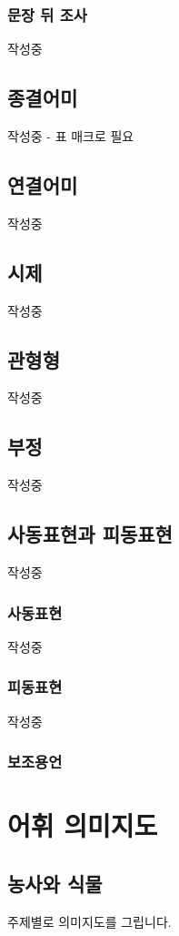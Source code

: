\documentclass{snu-fl-questionnaire}
\begin{document}
\subsection{문장 뒤 조사}
작성중

\section{종결어미}
작성중 - 표 매크로 필요

\section{연결어미}
작성중

\section{시제}
작성중

\section{관형형}
작성중

\section{부정}
작성중

\section{사동표현과 피동표현}
작성중

\subsection{사동표현}
작성중

\subsection{피동표현}
작성중

\subsection{보조용언}

\chapter{어휘 의미지도}
\section{농사와 식물}
주제별로 의미지도를 그립니다.
\end{document}
